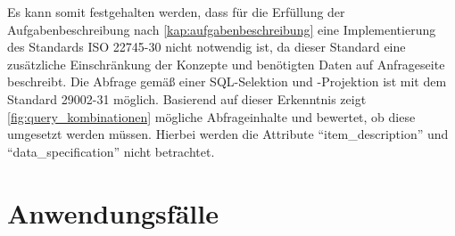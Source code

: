 Es kann somit festgehalten werden, dass für die Erfüllung der Aufgabenbeschreibung nach \autoref{kap:aufgabenbeschreibung} eine Implementierung des Standards ISO 22745-30 nicht notwendig ist, da dieser Standard eine zusätzliche Einschränkung der Konzepte und benötigten Daten auf Anfrageseite beschreibt. Die Abfrage gemäß einer SQL-Selektion und -Projektion ist mit dem Standard 29002-31 möglich. Basierend auf dieser Erkenntnis zeigt \autoref{fig:query_kombinationen} mögliche Abfrageinhalte und bewertet, ob diese umgesetzt werden müssen. Hierbei werden die Attribute \enquote{item\_description} und \enquote{data\_specification} nicht betrachtet.

\section{Anwendungsfälle}\label{kap:Use_Cases}

